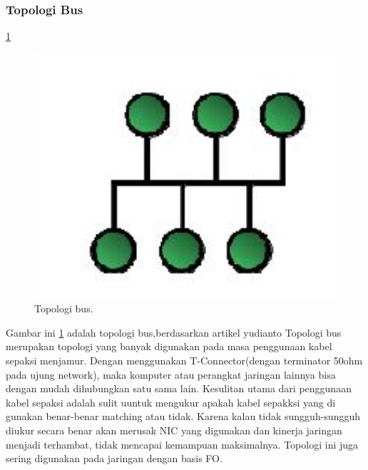   \subsubsection{Topologi Bus}
    \ref{bus}
  	\begin{figure}[ht]
  	\centerline{\includegraphics[width=1\textwidth]{figures/bus.JPG}}
  	\caption{Topologi bus.}
  	\label{bus}
  	\end{figure}
    Gambar ini \ref{bus} adalah topologi bus,berdasarkan artikel yudianto Topologi bus merupakan topologi yang banyak digunakan pada masa penggunaan kabel sepaksi menjamur\cite{yudianto2007jaringan}. Dengan menggunakan T-Connector(dengan terminator 50ohm pada ujung network), maka komputer atau perangkat jaringan lainnya bisa dengan mudah dihubungkan satu sama lain.
  Kesulitan utama dari penggunaan kabel sepaksi adalah sulit uuntuk mengukur apakah kabel sepakksi yang di gunakan benar-benar matching atau tidak. Karena kalau tidak sungguh-sungguh diukur secara benar akan merusak NIC yang digunakan dan kinerja jaringan menjadi terhambat, tidak mencapai kemampuan maksimalnya. Topologi ini juga sering digunakan pada jaringan dengan basis FO.
